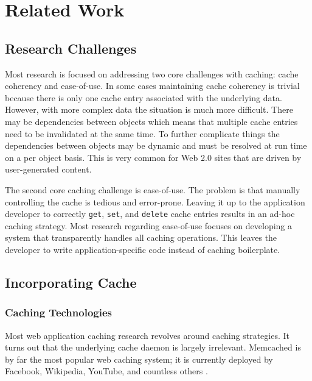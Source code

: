 \documentclass[12pt]{ucthesis}
\begin{document}


\section{Related Work}
\subsection{Research Challenges}
Most research is focused on addressing two core challenges with caching: cache coherency and ease-of-use.
In some cases maintaining cache coherency is trivial because there is only one cache entry associated with the underlying data.
However, with more complex data the situation is much more difficult.
There may be dependencies between objects which means that multiple cache entries need to be invalidated at the same time.
To further complicate things the dependencies between objects may be dynamic and must be resolved at run time on a per object basis.
This is very common for Web 2.0 sites that are driven by user-generated content.

The second core caching challenge is ease-of-use.
The problem is that manually controlling the cache is tedious and error-prone.
Leaving it up to the application developer to correctly {\tt get}, {\tt set}, and {\tt delete} cache entries results in an ad-hoc caching strategy.
Most research regarding ease-of-use focuses on developing a system that transparently handles all caching operations.
This leaves the developer to write application-specific code instead of caching boilerplate.

\subsection{Incorporating Cache}
\subsubsection{Caching Technologies}
Most web application caching research revolves around caching strategies.
It turns out that the underlying cache daemon is largely irrelevant.
{\textsf Memcached} is by far the most popular web caching system; it is currently deployed by Facebook, Wikipedia, YouTube, and countless others \cite{memcachedDotOrg}.
\end{document}

